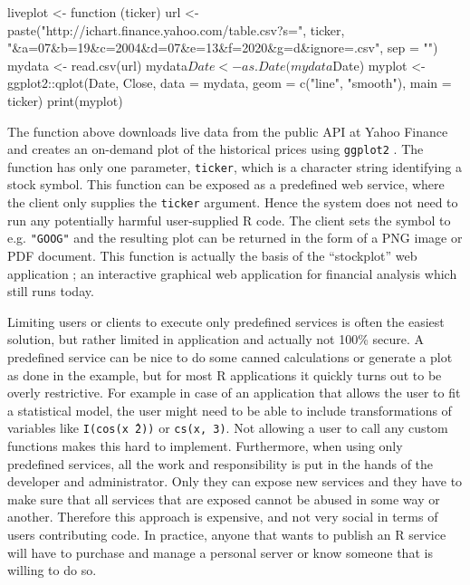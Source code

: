 \documentclass[article]{jss}
\newcommand{\R}{\textsf{R}\xspace}
\begin{document}
\begin{CodeChunk}
\begin{CodeInput}
liveplot <- function (ticker) {
  url <- paste("http://ichart.finance.yahoo.com/table.csv?s=",
    ticker, "&a=07&b=19&c=2004&d=07&e=13&f=2020&g=d&ignore=.csv",
    sep = "")
  mydata <- read.csv(url)
  mydata$Date <- as.Date(mydata$Date)
  myplot <- ggplot2::qplot(Date, Close, data = mydata, geom = c("line",
    "smooth"), main = ticker)
  print(myplot)
}
\end{CodeInput}
\end{CodeChunk}

The function above downloads live data from the public API at Yahoo Finance and
creates an on-demand plot of the historical prices using \texttt{ggplot2}
\citep{ggplot2}. The function has only one parameter, \texttt{ticker}, which is
a character string identifying a stock symbol. This function can be exposed as a
predefined web service, where the client only supplies the \texttt{ticker}
argument. Hence the system does not need to run any potentially harmful
user-supplied \R code. The client sets the symbol to e.g.
\texttt{"GOOG"} and the resulting plot can be returned in the form of a
PNG image or PDF document. This function is actually the basis of the
``stockplot'' web application \citep{stockplot}; an interactive graphical web
application for financial analysis which still runs today.

Limiting users or clients to execute only predefined services is often the
easiest solution, but rather limited in application and actually not 100\%
secure. A predefined service can be nice to do some canned calculations or
generate a plot as done in the example, but for most \R applications
it quickly turns out to be overly restrictive. For example in case of an
application that allows the user to fit a statistical model, the user might
need to be able to include transformations of variables like \texttt{I(cos(x\^\ 2))} or \texttt{cs(x, 3)}. Not allowing a
user to call any custom functions makes this hard to implement.
Furthermore, when using only predefined services, all the work and
responsibility is put in the hands of the developer and administrator. Only they
can expose new services and they have to make sure that all services that are
exposed cannot be abused in some way or another. Therefore this approach is
expensive, and not very social in terms of users contributing code. In practice,
anyone that wants to publish an \R service will have to purchase and
manage a personal server or know someone that is willing to do so.
\end{document}
